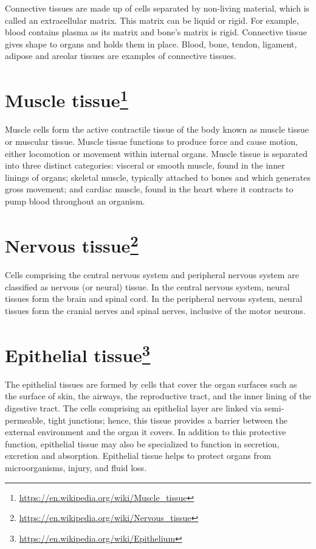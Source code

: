 \documentclass[]{book}
\let\rmarkdownfootnote\footnote%
\def\footnote{\protect\rmarkdownfootnote}
\renewcommand{\href}[2]{#2\footnote{\url{#1}}}
\begin{document}
Connective tissues are made up of cells separated by non-living material, which is called an extracellular matrix. This matrix can be liquid or rigid. For example, blood contains plasma as its matrix and bone's matrix is rigid. Connective tissue gives shape to organs and holds them in place. Blood, bone, tendon, ligament, adipose and areolar tissues are examples of connective tissues.

\hypertarget{muscle-tissue}{%
\section{\texorpdfstring{\href{https://en.wikipedia.org/wiki/Muscle_tissue}{Muscle tissue}}{Muscle tissue}}\label{muscle-tissue}}

Muscle cells form the active contractile tissue of the body known as muscle tissue or muscular tissue. Muscle tissue functions to produce force and cause motion, either locomotion or movement within internal organs. Muscle tissue is separated into three distinct categories: visceral or smooth muscle, found in the inner linings of organs; skeletal muscle, typically attached to bones and which generates gross movement; and cardiac muscle, found in the heart where it contracts to pump blood throughout an organism.

\hypertarget{nervous-tissue}{%
\section{\texorpdfstring{\href{https://en.wikipedia.org/wiki/Nervous_tissue}{Nervous tissue}}{Nervous tissue}}\label{nervous-tissue}}

Cells comprising the central nervous system and peripheral nervous system are classified as nervous (or neural) tissue. In the central nervous system, neural tissues form the brain and spinal cord. In the peripheral nervous system, neural tissues form the cranial nerves and spinal nerves, inclusive of the motor neurons.

\hypertarget{epithelial-tissue}{%
\section{\texorpdfstring{\href{https://en.wikipedia.org/wiki/Epithelium}{Epithelial tissue}}{Epithelial tissue}}\label{epithelial-tissue}}

The epithelial tissues are formed by cells that cover the organ surfaces such as the surface of skin, the airways, the reproductive tract, and the inner lining of the digestive tract. The cells comprising an epithelial layer are linked via semi-permeable, tight junctions; hence, this tissue provides a barrier between the external environment and the organ it covers. In addition to this protective function, epithelial tissue may also be specialized to function in secretion, excretion and absorption. Epithelial tissue helps to protect organs from microorganisms, injury, and fluid loss.
\end{document}
